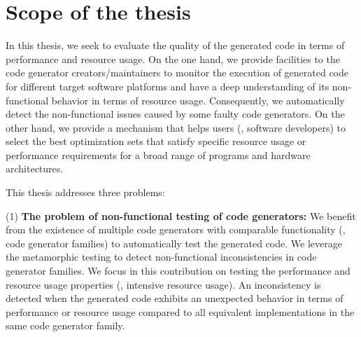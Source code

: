 



\section{Scope of the thesis}

In this thesis, we seek to evaluate the quality of the generated code in terms of performance and resource usage.
On the one hand, we provide facilities to the code generator creators/maintainers to monitor the execution of generated code for different target software platforms and have a deep understanding of its non-functional behavior in terms of resource usage. Consequently, we automatically detect the non-functional issues caused by some faulty code generators. 
On the other hand, we provide a mechanism that helps users (\ie, software developers) to select the best optimization sets that satisfy specific resource usage or performance requirements for a broad range of programs and hardware architectures.

This thesis addresses three problems: 
	
	(1) \textbf{The problem of non-functional testing of code generators:} We benefit from the existence of multiple code generators with comparable functionality (\ie, code generator families) to automatically test the generated code. We leverage the metamorphic testing\cite{chen1998metamorphic} to detect non-functional inconsistencies in code generator families.
	We focus in this contribution on testing the performance and resource usage properties (\eg, intensive resource usage).
	An inconsistency is detected when the generated code exhibits an unexpected behavior in terms of performance or resource usage compared to all equivalent implementations in the same code generator family.
	

